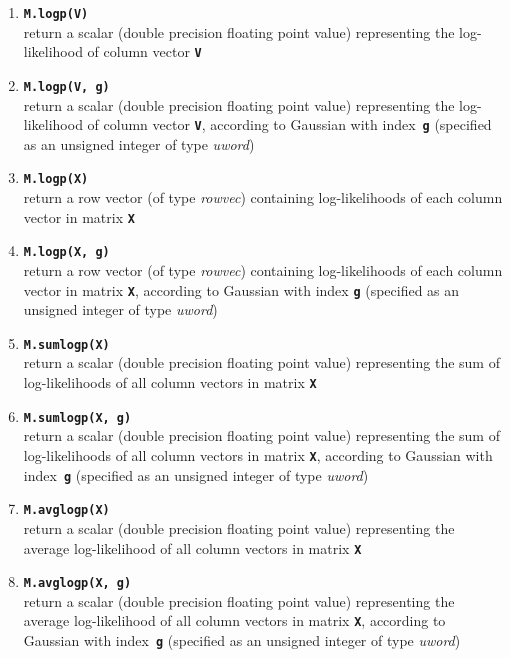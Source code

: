 \documentclass[10pt,a4paper]{article}
\def\_{{\tt\char95}}
\begin{document}
\begin{small}
\begin{enumerate}[{$\bullet$}]
\itemsep 1ex

\item
{\tt\bfseries M.log\_p(V)}\\
return a scalar (double precision floating point value) representing the log-likelihood of column vector {\tt\bfseries V}

\item
{\tt\bfseries M.log\_p(V, g)}\\
return a scalar (double precision floating point value) representing the log-likelihood of column vector {\tt\bfseries V},
according to Gaussian with index~{\tt\bfseries g} (specified as an unsigned integer of type {\it uword})

\item
{\tt\bfseries M.log\_p(X)}\\
return a row vector (of type {\it rowvec}) containing log-likelihoods of each column vector in matrix {\tt\bfseries X}


\item
{\tt\bfseries M.log\_p(X, g)}\\
return a row vector (of type {\it rowvec}) containing log-likelihoods of each column vector in matrix {\tt\bfseries X},
according to Gaussian with index {\tt\bfseries g}  (specified as an unsigned integer of type {\it uword})

\item
{\tt\bfseries M.sum\_log\_p(X)}\\
return a scalar (double precision floating point value) representing the sum of log-likelihoods of all column vectors in matrix {\tt\bfseries X}

\item
{\tt\bfseries M.sum\_log\_p(X, g)}\\
return a scalar (double precision floating point value) representing the sum of log-likelihoods of all column vectors in matrix {\tt\bfseries X},
according to Gaussian with index~{\tt\bfseries g}  (specified as an unsigned integer of type {\it uword})

\item
{\tt\bfseries M.avg\_log\_p(X)}\\
return a scalar (double precision floating point value) representing the average log-likelihood of all column vectors in matrix {\tt\bfseries X}

\item
{\tt\bfseries M.avg\_log\_p(X, g)}\\
return a scalar (double precision floating point value) representing the average log-likelihood of all column vectors in matrix {\tt\bfseries X},
according to Gaussian with index~{\tt\bfseries g}  (specified as an unsigned integer of type {\it uword})


\end{enumerate}
\end{small}
\end{document}
